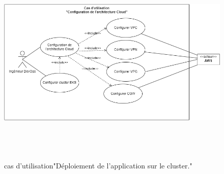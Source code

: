 \begin{figure}[H]
    \begin{center}
    \includegraphics[height=10cm]{usecasedet.drawio.png}
    \end{center}
    \caption{cas d’utilisation"Déploiement de l'application sur
le cluster."}
    \end{figure}

